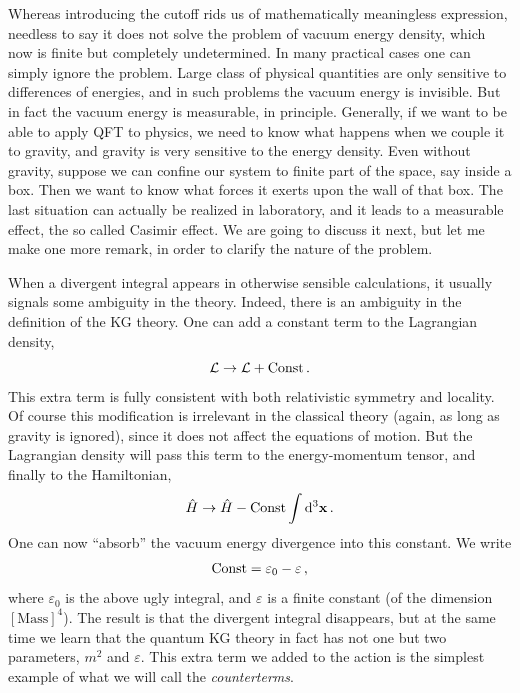 Whereas introducing the cutoff rids us of mathematically meaningless
expression, needless to say it does not solve the problem of vacuum energy
density, which now is finite but completely undetermined. In many practical
cases one can simply ignore the problem. Large class of physical quantities
are only sensitive to differences of energies, and in such problems the
vacuum energy is invisible. But in fact the vacuum energy is measurable, in
principle. Generally, if we want to be able to apply QFT to physics, we need
to know what happens when we couple it to gravity, and gravity is very
sensitive to the energy density. Even without gravity, suppose we can confine
our system to finite part of the space, say inside a box. Then we want to know
what forces it exerts upon the wall of that box. The last situation can
actually be realized in laboratory, and it leads to a measurable effect, the
so called Casimir effect. We are going to discuss it next, but let me make one
more remark, in order to clarify the nature of the problem.

When a divergent integral appears in otherwise sensible calculations, it
usually signals some ambiguity in the theory. Indeed, there is an ambiguity
in the definition of the KG theory. One can add a constant term to the
Lagrangian density,
\[
\mathcal{L}\to\mathcal{L}+\text{Const}\,.
\]
This extra term is fully consistent with both relativistic symmetry and
locality. Of course this modification is irrelevant in the classical theory
(again, as long as gravity is ignored), since it does not affect the
equations of motion. But the Lagrangian density will pass this term to the
energy-momentum tensor, and finally to the Hamiltonian,
\[
\hat H\to\hat H-\text{Const}\int \mathop{}\!\mathrm{d}^3\mathbf{x}\,.
\]
One can now ``absorb'' the vacuum energy divergence into this constant. We
write
\[
\text{Const}=\varepsilon_0-\varepsilon\,,
\]
where $\varepsilon_0$ is the above ugly integral, and $\varepsilon$ is a
finite constant (of the dimension $[\text{Mass}]^4$). The result is that the
divergent integral disappears, but at the same time we learn that the quantum
KG theory in fact has not one but two parameters, $m^2$ and $\varepsilon$.
This extra term we added to the action is the simplest example of what we
will call the \emph{counterterms}.
